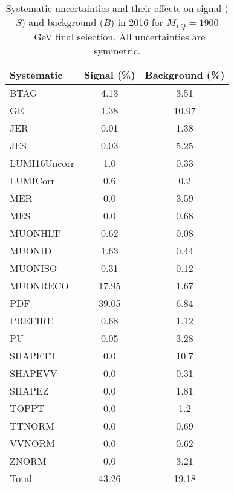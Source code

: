 \begin{table}[htbp]
\begin{center}
\caption{Systematic uncertainties and their effects on signal ($S$) and background ($B$) in 2016 for $M_{LQ}=1900$~GeV final selection. All uncertainties are symmetric.}
\begin{tabular}{lcc}
\hline\hline
Systematic & Signal (\%) & Background (\%) \\ \hline 
BTAG & 4.13 & 3.51\\ 
GE & 1.38 & 10.97\\ 
JER & 0.01 & 1.38\\ 
JES & 0.03 & 5.25\\ 
LUMI16Uncorr & 1.0 & 0.33\\ 
LUMICorr & 0.6 & 0.2\\ 
MER & 0.0 & 3.59\\ 
MES & 0.0 & 0.68\\ 
MUONHLT & 0.62 & 0.08\\ 
MUONID & 1.63 & 0.44\\ 
MUONISO & 0.31 & 0.12\\ 
MUONRECO & 17.95 & 1.67\\ 
PDF & 39.05 & 6.84\\ 
PREFIRE & 0.68 & 1.12\\ 
PU & 0.05 & 3.28\\ 
SHAPETT & 0.0 & 10.7\\ 
SHAPEVV & 0.0 & 0.31\\ 
SHAPEZ & 0.0 & 1.81\\ 
TOPPT & 0.0 & 1.2\\ 
TTNORM & 0.0 & 0.69\\ 
VVNORM & 0.0 & 0.62\\ 
ZNORM & 0.0 & 3.21\\ 
Total & 43.26 & 19.18\\ \hline \hline
\end{tabular}
\label{tab:SysUncertainties_uujj_1900}
\end{center}
\end{table}

